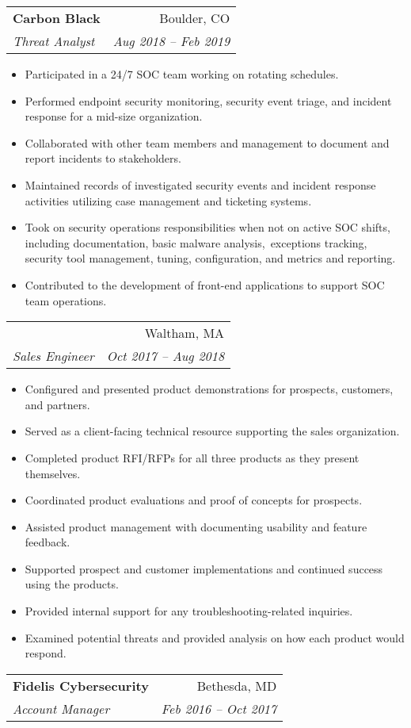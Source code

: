 \documentclass[letterpaper,11pt]{article}
\makeatletter
\newcommand{\resumeSubheading}[4]{
  \vspace{-1pt}\item
    \begin{tabular*}{0.97\textwidth}[t]{l@{\extracolsep{\fill}}r}
      \textbf{#1} & #2 \\
      \textit{\small#3} & \textit{\small #4} \\
    \end{tabular*}\vspace{-5pt}
}
\newcommand{\resumeSubSubheading}[4]{
  \vspace{2pt}
    \begin{tabular*}{0.97\textwidth}[t]{l@{\extracolsep{\fill}}r}
      #1 & #2 \\
      \textit{\small#3} & \textit{\small#4} \\
    \end{tabular*}\vspace{-5pt}
}
\newcommand{\resumeItemListStart}{\begin{itemize}[nosep]}
\newcommand{\resumeItemListEnd}{\end{itemize}\vspace{-5pt}}
\makeatother
\begin{document}
\resumeSubheading
{Carbon Black}{Boulder, CO}
{Threat Analyst}{Aug 2018 -- Feb 2019}
\resumeItemListStart
\item Participated in a 24/7 SOC team working on rotating schedules.
\item Performed endpoint security monitoring, security event triage, and incident response for a mid-size organization.
\item Collaborated with other team members and management to document and report incidents to stakeholders.
\item Maintained records of investigated security events and incident response activities utilizing case management and ticketing systems.
\item Took on security operations responsibilities when not on active SOC shifts, including documentation, basic malware analysis,\
exceptions tracking, security tool management, tuning, configuration, and metrics and reporting.
\item Contributed to the development of front-end applications to support SOC team operations.
\resumeItemListEnd

\resumeSubSubheading
{}{Waltham, MA}
{Sales Engineer}{Oct 2017 -- Aug 2018}
\resumeItemListStart
\item Configured and presented product demonstrations for prospects, customers, and partners.
\item Served as a client-facing technical resource supporting the sales organization.
\item Completed product RFI/RFPs for all three products as they present themselves.
\item Coordinated product evaluations and proof of concepts for prospects.
\item Assisted product management with documenting usability and feature feedback.
\item Supported prospect and customer implementations and continued success using the products.
\item Provided internal support for any troubleshooting-related inquiries.
\item Examined potential threats and provided analysis on how each product would respond.
\resumeItemListEnd

\resumeSubheading
{Fidelis Cybersecurity}{Bethesda, MD}
{Account Manager}{Feb 2016 -- Oct 2017}
\end{document}
